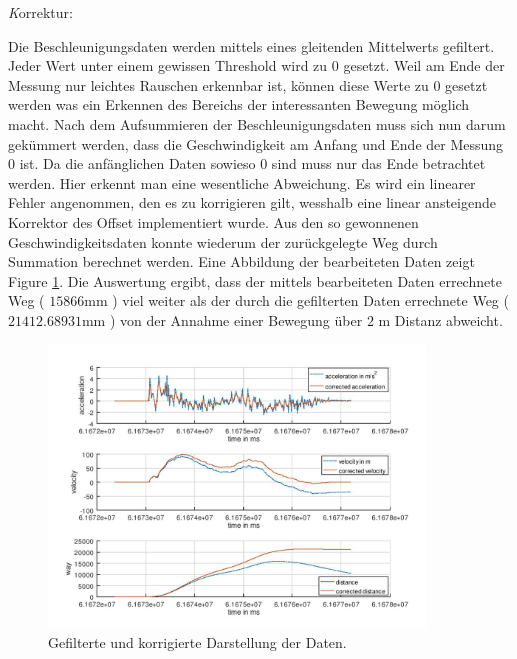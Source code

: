 \documentclass[12pt]{article}
\begin{document}
\textit Korrektur:

Die Beschleunigungsdaten werden mittels eines gleitenden Mittelwerts gefiltert. Jeder Wert unter einem gewissen Threshold wird zu 0 gesetzt. Weil am Ende der Messung nur leichtes Rauschen erkennbar ist, können diese Werte zu 0 gesetzt werden was ein Erkennen des Bereichs der interessanten Bewegung möglich macht. 
Nach dem Aufsummieren der Beschleunigungsdaten muss sich nun darum gekümmert werden, dass die Geschwindigkeit am Anfang und Ende der Messung 0 ist. Da die anfänglichen Daten sowieso 0 sind muss nur das Ende betrachtet werden. Hier erkennt man eine wesentliche Abweichung. Es wird ein linearer Fehler angenommen, den es zu korrigieren gilt, wesshalb eine linear ansteigende Korrektor des Offset implementiert wurde. 
Aus den so gewonnenen Geschwindigkeitsdaten konnte wiederum der zurückgelegte Weg durch Summation berechnet werden.
Eine Abbildung der bearbeiteten Daten zeigt Figure \ref{fig:filteredData}. Die Auswertung ergibt, dass der mittels bearbeiteten Daten errechnete Weg ( $ 15866$mm ) viel weiter als der durch die gefilterten Daten errechnete Weg ( $21412.68931$mm ) von der Annahme einer Bewegung über $2$ m Distanz abweicht.

\begin{figure}[H]
	\centering
	\includegraphics[width=10cm]{images/filteredData.jpg}
	\caption{Gefilterte und korrigierte Darstellung der Daten.}
	\label{fig:filteredData}
\end{figure}


\newpage

\end{document}
